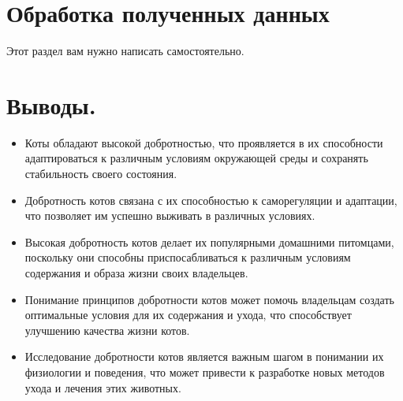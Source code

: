 \documentclass[12pt,a4paper]{article}
\begin{document}
\section{Обработка полученных данных}
Этот раздел вам нужно написать самостоятельно.

\section{Выводы.}
\begin{itemize}
    \item Коты обладают высокой добротностью, что проявляется в их способности адаптироваться к различным условиям окружающей среды и сохранять стабильность своего состояния.
    \item Добротность котов связана с их способностью к саморегуляции и адаптации, что позволяет им успешно выживать в различных условиях.
    \item Высокая добротность котов делает их популярными домашними питомцами, поскольку они способны приспосабливаться к различным условиям содержания и образа жизни своих владельцев.
    \item Понимание принципов добротности котов может помочь владельцам создать оптимальные условия для их содержания и ухода, что способствует улучшению качества жизни котов.
    \item Исследование добротности котов является важным шагом в понимании их физиологии и поведения, что может привести к разработке новых методов ухода и лечения этих животных.
\end{itemize}
\end{document}
